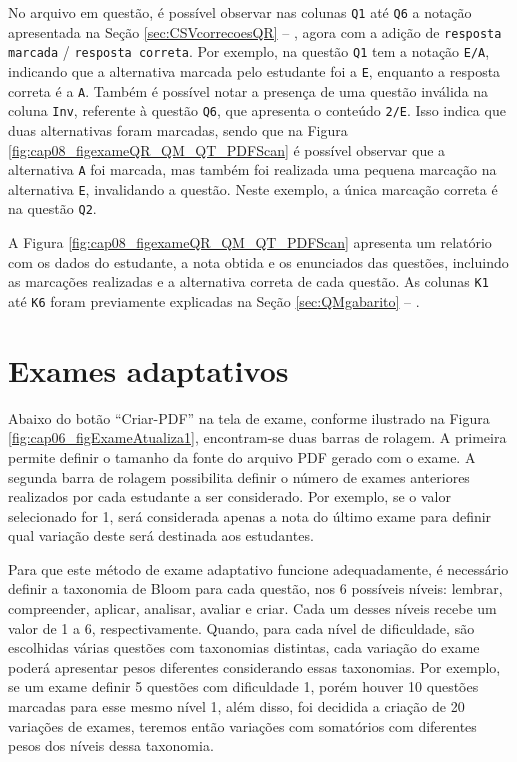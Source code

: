 No arquivo em questão, é possível observar nas colunas \verb|Q1| até \verb|Q6| a notação apresentada na Seção \ref{sec:CSVcorrecoesQR} -- , agora com a adição de \verb|resposta marcada| / \verb|resposta correta|. Por exemplo, na questão \verb|Q1| tem a notação \verb|E/A|, indicando que a alternativa marcada pelo estudante foi a \verb|E|, enquanto a resposta correta é a \verb|A|. Também é possível notar a presença de uma questão inválida na coluna \verb|Inv|, referente à questão \verb|Q6|, que apresenta o conteúdo \verb|2/E|. Isso indica que duas alternativas foram marcadas, sendo que na Figura \ref{fig:cap08_figexameQR_QM_QT_PDFScan} é possível observar que a alternativa \verb|A| foi marcada, mas também foi realizada uma pequena marcação na alternativa \verb|E|, invalidando a questão. Neste exemplo, a única marcação correta é na questão \verb|Q2|.

A Figura \ref{fig:cap08_figexameQR_QM_QT_PDFScan} apresenta um relatório com os dados do estudante, a nota obtida e os enunciados das questões, incluindo as marcações realizadas e a alternativa correta de cada questão. As colunas \verb|K1| até \verb|K6| foram previamente explicadas na Seção \ref{sec:QMgabarito} -- .

\section{Exames adaptativos}\label{sec:testeAdaptativo}

Abaixo do botão ``Criar-PDF'' na tela de exame, conforme ilustrado na Figura \ref{fig:cap06_figExameAtualiza1}, encontram-se duas barras de rolagem. A primeira permite definir o tamanho da fonte do arquivo PDF gerado com o exame. A segunda barra de rolagem possibilita definir o número de exames anteriores realizados por cada estudante a ser considerado. Por exemplo, se o valor selecionado for 1, será considerada apenas a nota do último exame para definir qual variação deste será destinada aos estudantes.

Para que este método de exame adaptativo funcione adequadamente, é necessário definir a taxonomia de Bloom para cada questão, nos 6 possíveis níveis: lembrar, compreender, aplicar, analisar, avaliar e criar. Cada um desses níveis recebe um valor de 1 a 6, respectivamente. Quando, para cada nível de dificuldade, são escolhidas várias questões com taxonomias distintas, cada variação do exame poderá apresentar pesos diferentes considerando essas taxonomias. Por exemplo, se um exame definir 5 questões com dificuldade 1, porém houver 10 questões marcadas para esse mesmo nível 1, além disso, foi decidida a criação de 20 variações de exames, teremos então variações com somatórios com diferentes pesos dos níveis dessa taxonomia.

